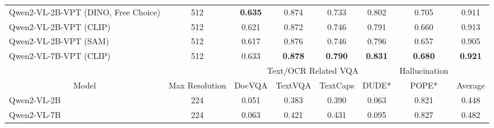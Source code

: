 \begin{table*}[t]
{\begin{tabular}{lcccccc|c}
\rowcolor{fullgreen!20} 
Qwen2-VL-2B-VPT (DINO, Free Choice)         & 512                              & \textbf{0.635} & 0.874 & \multicolumn{1}{c|}{\cellcolor{fullgreen!20}0.733} & 0.802                                              & 0.705          & 0.911            \\ 
\rowcolor{fullgreen!20} 
Qwen2-VL-2B-VPT (CLIP)                      & 512                              & 0.621 & 0.872 & \multicolumn{1}{c|}{\cellcolor{fullgreen!20}0.746} & 0.791                                              & 0.660          & 0.913            \\ 
\rowcolor{fullgreen!20} 
Qwen2-VL-2B-VPT (SAM)                       & 512                              & 0.617 & 0.876 & \multicolumn{1}{c|}{\cellcolor{fullgreen!20}0.746} & 0.796                                              & 0.657          & 0.905            \\ 
\rowcolor{fullred!20} 
Qwen2-VL-7B-VPT (CLIP)                      & 512                              & 0.633 & \textbf{0.878} & \multicolumn{1}{c|}{\cellcolor{fullred!20}\textbf{0.790}} & \textbf{0.831}                                              & \textbf{0.680}          & \textbf{0.921}            \\ \bottomrule\toprule
                                            &                                  & \multicolumn{4}{c|}{Text/OCR Related VQA}                                                                                                                   & Hallucination  &                           \\ \cmidrule(lr){3-7}
\multicolumn{1}{c}{\multirow{-2}{*}{Model}}                    & \multirow{-2}{*}{Max Resolution} & DocVQA         & TextVQA        & TextCaps                                                    & \multicolumn{1}{c|}{DUDE*}                                  & POPE*          & \multirow{-2}{*}{Average} \\ \midrule
Qwen2-VL-2B                                 & 224                              & 0.051          & 0.383          & 0.390                                                       & \multicolumn{1}{c|}{0.063}                                  & 0.821          & 0.448                     \\
Qwen2-VL-7B                                 & 224                              & 0.063          & 0.421          & 0.431                                                       & \multicolumn{1}{c|}{0.095}                                  & 0.827          & 0.482                     \\

\end{tabular}}
\end{table*}
